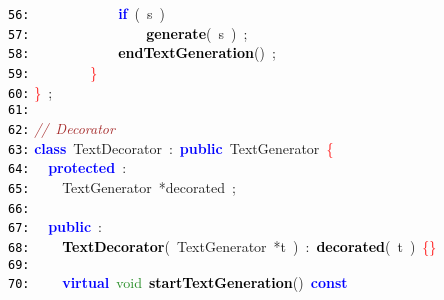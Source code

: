 \documentclass{article}
\begin{document}
\mbox{}\texttt{\textcolor{Black}{56:}} \ \ \ \ \ \ \ \ \ \ \ \ \textbf{\textcolor{Blue}{if}}\ \textcolor{BrickRed}{(}\ s\ \textcolor{BrickRed}{)} \\
\mbox{}\texttt{\textcolor{Black}{57:}} \ \ \ \ \ \ \ \ \ \ \ \ \ \ \ \ \textbf{\textcolor{Black}{generate}}\textcolor{BrickRed}{(}\ s\ \textcolor{BrickRed}{)}\ \textcolor{BrickRed}{;} \\
\mbox{}\texttt{\textcolor{Black}{58:}} \ \ \ \ \ \ \ \ \ \ \ \ \textbf{\textcolor{Black}{endTextGeneration}}\textcolor{BrickRed}{()}\ \textcolor{BrickRed}{;} \\
\mbox{}\texttt{\textcolor{Black}{59:}} \ \ \ \ \ \ \ \ \textcolor{Red}{\}} \\
\mbox{}\texttt{\textcolor{Black}{60:}} \textcolor{Red}{\}}\ \textcolor{BrickRed}{;} \\
\mbox{}\texttt{\textcolor{Black}{61:}}  \\
\mbox{}\texttt{\textcolor{Black}{62:}} \textit{\textcolor{Brown}{//\ Decorator}} \\
\mbox{}\texttt{\textcolor{Black}{63:}} \textbf{\textcolor{Blue}{class}}\ \textcolor{TealBlue}{\label{test.h:63}TextDecorator}\ \textcolor{BrickRed}{:}\ \textbf{\textcolor{Blue}{public}}\ TextGenerator\ \textcolor{Red}{\{} \\
\mbox{}\texttt{\textcolor{Black}{64:}} \ \ \textbf{\textcolor{Blue}{protected}}\ \textcolor{BrickRed}{:} \\
\mbox{}\texttt{\textcolor{Black}{65:}} \ \ \ \ \textcolor{TealBlue}{TextGenerator}\ \textcolor{BrickRed}{*}\label{test.h:65}decorated\ \textcolor{BrickRed}{;} \\
\mbox{}\texttt{\textcolor{Black}{66:}} \ \  \\
\mbox{}\texttt{\textcolor{Black}{67:}} \ \ \textbf{\textcolor{Blue}{public}}\ \textcolor{BrickRed}{:} \\
\mbox{}\texttt{\textcolor{Black}{68:}} \ \ \ \ \textbf{\textcolor{Black}{\label{test.h:68}TextDecorator}}\textcolor{BrickRed}{(}\ \textcolor{TealBlue}{TextGenerator}\ \textcolor{BrickRed}{*}t\ \textcolor{BrickRed}{)}\ \textcolor{BrickRed}{:}\ \textbf{\textcolor{Black}{decorated}}\textcolor{BrickRed}{(}\ t\ \textcolor{BrickRed}{)}\ \textcolor{Red}{\{\}} \\
\mbox{}\texttt{\textcolor{Black}{69:}}  \\
\mbox{}\texttt{\textcolor{Black}{70:}} \ \ \ \ \textbf{\textcolor{Blue}{virtual}}\ \textcolor{ForestGreen}{void}\ \textbf{\textcolor{Black}{\label{test.h:70}startTextGeneration}}\textcolor{BrickRed}{()}\ \textbf{\textcolor{Blue}{const}}\  \\
\end{document}
